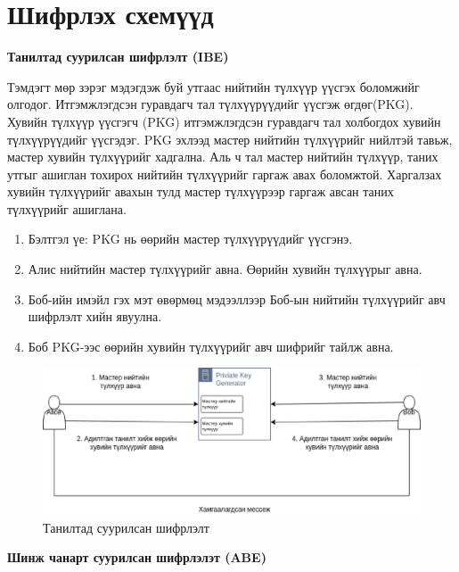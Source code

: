 
\section{Шифрлэх схемүүд}

\textbf{Танилтад суурилсан шифрлэлт (IBE)} 

Тэмдэгт мөр зэрэг мэдэгдэж буй утгаас нийтийн түлхүүр үүсгэх боломжийг олгодог. Итгэмжлэгдсэн гуравдагч тал түлхүүрүүдийг үүсгэж өгдөг(PKG). 
Хувийн түлхүүр үүсгэгч (PKG) итгэмжлэгдсэн гуравдагч тал холбогдох хувийн түлхүүрүүдийг үүсгэдэг. PKG эхлээд мастер нийтийн түлхүүрийг нийлтэй тавьж, мастер хувийн түлхүүрийг хадгална. Аль ч тал мастер нийтийн түлхүүр, таних утгыг ашиглан тохирох нийтийн түлхүүрийг гаргаж авах боломжтой. Харгалзах хувийн түлхүүрийг авахын тулд мастер түлхүүрээр гаргаж авсан таних түлхүүрийг ашиглана. \cite{WikiIDE}

\begin{enumerate}
    \item Бэлтгэл үе: PKG нь өөрийн мастер түлхүүрүүдийг үүсгэнэ.
    \item Алис нийтийн мастер түлхүүрийг авна. Өөрийн хувийн түлхүүрыг авна.
    \item Боб-ийн имэйл гэх мэт өвөрмөц мэдээллээр Боб-ын нийтийн түлхүүрийг авч шифрлэлт хийн явуулна.
    \item Боб PKG-ээс өөрийн хувийн түлхүүрийг авч шифрийг тайлж авна.
\end{enumerate}

\begin{figure}[ht]
\centering
\includegraphics[scale=0.6]{Figures/IBE.eps}
\caption[IBE]{Танилтад суурилсан шифрлэлт}
\label{fig:IBE}
\end{figure}


\textbf{Шинж чанарт суурилсан шифрлэлэт (ABE)}

